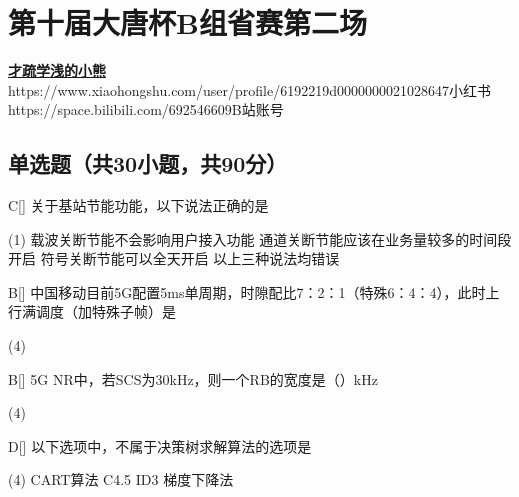\chapter{第十届大唐杯B组省赛第二场}
\fancyhead[R]{\color{H6}\kaishu\rightmark\,}

\date{2023年4月15日}{}{\href{https://github.com/xubenshan/dtcup}{\textbf{才疏学浅的小熊}}}
{}
{https://www.xiaohongshu.com/user/profile/6192219d0000000021028647}{小红书}
{https://space.bilibili.com/692546609}{B站账号}




\section{单选题（共30小题，共90分）}



\begin{choice}{C}[]
    关于基站节能功能，以下说法正确的是
    \begin{tasks}(1)
        \task 载波关断节能不会影响用户接入功能
        \task 通道关断节能应该在业务量较多的时间段开启
        \task 符号关断节能可以全天开启
        \task 以上三种说法均错误
    \end{tasks}
\end{choice}


\begin{choice}{B}[]
    中国移动目前5G配置5ms单周期，时隙配比7：2：1（特殊6：4：4），此时上行满调度（加特殊子帧）是
    \begin{tasks}(4)
    \end{tasks}
\end{choice}




\begin{choice}{B}[]
    5G NR中，若SCS为30kHz，则一个RB的宽度是（\qquad）kHz
    \begin{tasks}(4)
    \end{tasks}
\end{choice}



\begin{choice}{D}[]
    以下选项中，不属于决策树求解算法的选项是
    \begin{tasks}(4)
        \task CART算法
        \task C4.5
        \task ID3
        \task 梯度下降法
    \end{tasks}
\end{choice}

